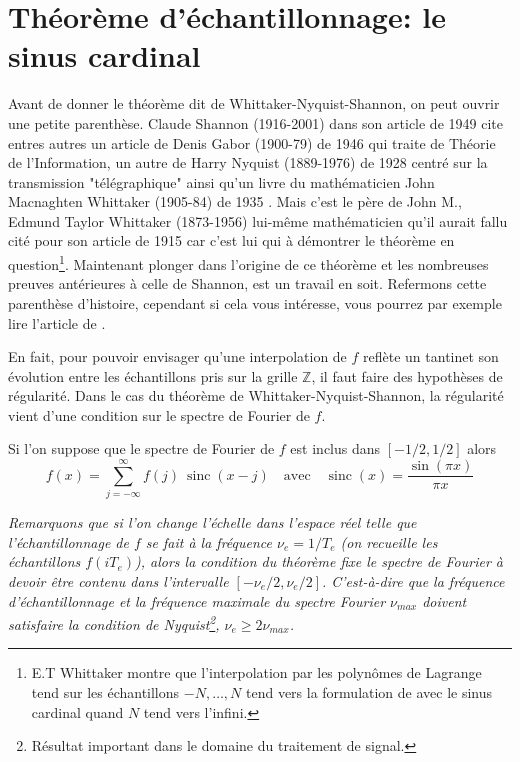 \documentclass[11pt,twoside]{article}
\DeclareMathOperator{\sinc}{sinc}
\begin{document}
\section{Théorème d'échantillonnage: le sinus cardinal}
%
Avant de donner le théorème dit de Whittaker-Nyquist-Shannon, on peut ouvrir une petite parenthèse. Claude Shannon (1916-2001) dans son article de 1949 \citep{1697831} cite entres autres un article de Denis Gabor (1900-79) de 1946 \citep{gabor1946} qui traite de Théorie de l'Information, un autre  de Harry Nyquist (1889-1976) de 1928 \citep{Nyquist1928CertainTI} centré sur la transmission "télégraphique" ainsi qu'un livre du mathématicien John Macnaghten  Whittaker (1905-84) de 1935 \citep{whittaker1949interpolatory}. Mais c'est le père de John M., Edmund Taylor Whittaker (1873-1956) lui-même mathématicien qu'il aurait fallu cité pour son article de 1915 \citep{whittaker_1915} car c'est lui qui à démontrer le théorème en question\footnote{E.T Whittaker montre que l'interpolation par les polynômes de Lagrange tend sur les échantillons $-N,\dots,N$ tend vers la formulation de avec le sinus cardinal quand $N$ tend vers l'infini.}. Maintenant plonger dans l'origine de ce théorème et les nombreuses preuves antérieures à celle de Shannon, est un travail en soit. Refermons cette parenthèse d'histoire, cependant si cela vous intéresse, vous pourrez par exemple lire l'article de \cite{Dodson2002}.

En fait, pour pouvoir envisager qu'une interpolation de $f$ reflète un tantinet son évolution entre les échantillons pris sur la grille $\mathbb{Z}$, il faut faire des hypothèses de régularité. Dans le cas du théorème de Whittaker-Nyquist-Shannon, la régularité vient d'une condition sur le spectre de Fourier de $f$.
\begin{thm}
Si l'on suppose que le spectre de Fourier de $f$ est inclus dans $[-1/2,1/2]$ alors
\begin{equation}
f(x) = \sum_{j=-\infty}^{\infty} f(j)\ \sinc(x-j) \quad \mathrm{avec} \quad
\sinc(x)= \frac{\sin(\pi x)}{\pi x}
\end{equation}
\label{th:sampling}
\end{thm}
\textit{\small Remarquons que  si l'on change l'échelle dans l'espace réel telle que l'échantillonnage de $f$ se fait à la fréquence $\nu_e=1/T_e$ (on recueille les échantillons $f(i T_e)$), alors la condition du théorème fixe le spectre de Fourier à devoir être contenu dans l'intervalle $[-\nu_e/2,\nu_e/2]$. C'est-à-dire que la fréquence d'échantillonnage et la fréquence maximale du spectre Fourier $\nu_{max}$ doivent satisfaire la condition de Nyquist\footnote{Résultat important dans le domaine du traitement de signal.}, $\nu_e \geq 2\nu_{max}$.
}
\end{document}
